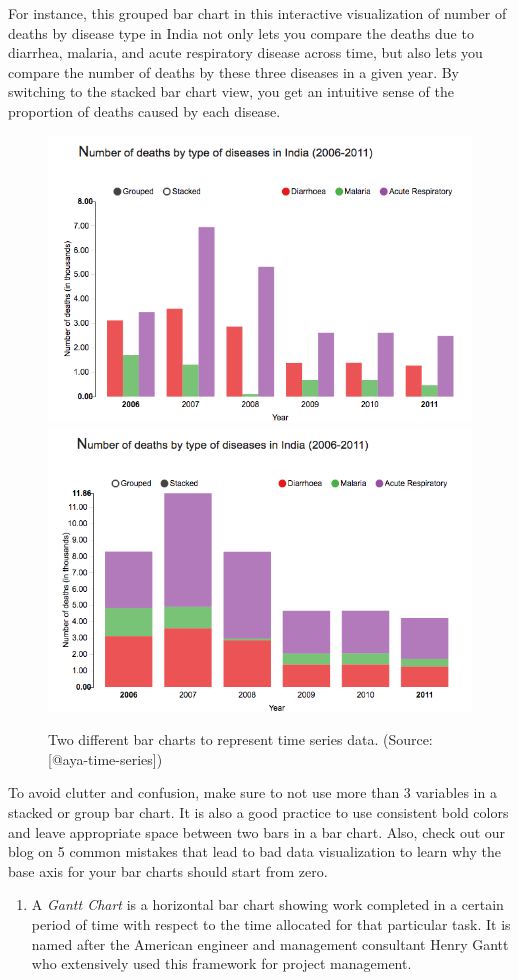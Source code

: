 \documentclass[]{book}
\providecommand{\tightlist}{%
  \setlength{\itemsep}{0pt}\setlength{\parskip}{0pt}}
\theoremstyle{definition}
\theoremstyle{definition}
\theoremstyle{definition}
\theoremstyle{remark}
\begin{document}
For instance, this grouped bar chart in this interactive visualization
of number of deaths by disease type in India not only lets you compare
the deaths due to diarrhea, malaria, and acute respiratory disease
across time, but also lets you compare the number of deaths by these
three diseases in a given year. By switching to the stacked bar chart
view, you get an intuitive sense of the proportion of deaths caused by
each disease.

\begin{figure}

{\centering \includegraphics[width=0.4\linewidth]{images/aya-bar1} \includegraphics[width=0.4\linewidth]{images/aya-bar2} 

}

\caption{Two different bar charts to represent time series data. (Source: [@aya-time-series])}\label{fig:aya-bar}
\end{figure}

To avoid clutter and confusion, make sure to not use more than 3
variables in a stacked or group bar chart. It is also a good practice to
use consistent bold colors and leave appropriate space between two bars
in a bar chart. Also, check out our blog on 5 common mistakes that lead
to bad data visualization to learn why the base axis for your bar charts
should start from zero.

\begin{enumerate}
\def\labelenumi{\arabic{enumi}.}
\setcounter{enumi}{3}
\tightlist
\item
  A \emph{Gantt Chart} is a horizontal bar chart showing work completed
  in a certain period of time with respect to the time allocated for
  that particular task. It is named after the American engineer and
  management consultant Henry Gantt who extensively used this framework
  for project management.
\end{enumerate}
\end{document}
